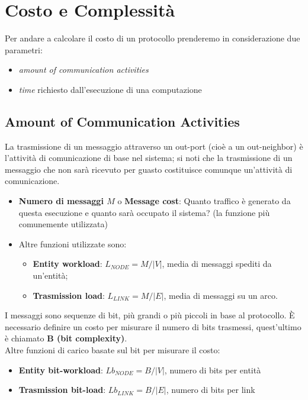 \section{Costo e Complessità}
Per andare a calcolare il costo di un protocollo prenderemo in considerazione due parametri:
\begin{itemize}
    \item \textit{amount of communication activities}
    \item \textit{time} richiesto dall'esecuzione di una computazione
\end{itemize}

\subsection{Amount of Communication Activities}
La trasmissione di un messaggio attraverso un out-port (cioè a un out-neighbor) è l'attività di comunicazione di base nel sistema; si noti che la trasmissione di un messaggio che non sarà ricevuto per guasto costituisce comunque un'attività di comunicazione.
\begin{itemize}
  \item \textbf{Numero di messaggi $M$} o \textbf{Message cost}: Quanto traffico è generato da questa esecuzione e quanto sarà occupato il sistema? (la funzione più comunemente utilizzata)
  \item Altre funzioni utilizzate sono:
  \begin{itemize}
    \item \textbf{Entity workload}: $L_{NODE} = M / |V|$, media di messaggi spediti da un'entità;
    \item \textbf{Trasmission load}: $L_{LINK} = M / |E|$, media di messaggi su un arco.
  \end{itemize}
 \end{itemize}

I messaggi sono sequenze di bit, più grandi o più piccoli in base al protocollo. È necessario definire un costo per misurare il numero di bits trasmessi, quest'ultimo è chiamato \textbf{B (bit complexity)}.\\
Altre funzioni di carico basate sul bit per misurare il costo:
\begin{itemize}
    \item \textbf{Entity bit-workload}: $Lb_{NODE} = B / |V|$, numero di bits per entità
    \item \textbf{Trasmission bit-load}: $Lb_{LINK} = B / |E|$, numero di bits per link 
\end{itemize}

